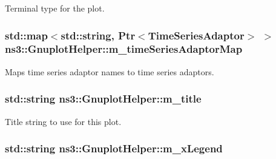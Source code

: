 Terminal type for the plot. 

\subsubsection[{\texorpdfstring{m\+\_\+time\+Series\+Adaptor\+Map}{m_timeSeriesAdaptorMap}}]{\setlength{\rightskip}{0pt plus 5cm}std\+::map$<$std\+::string, {\bf Ptr}$<${\bf Time\+Series\+Adaptor}$>$ $>$ ns3\+::\+Gnuplot\+Helper\+::m\+\_\+time\+Series\+Adaptor\+Map\hspace{0.3cm}{\ttfamily [private]}}\hypertarget{classns3_1_1GnuplotHelper_ad013691ac007d20ac6c04261dda2432a}{}\label{classns3_1_1GnuplotHelper_ad013691ac007d20ac6c04261dda2432a}


Maps time series adaptor names to time series adaptors. 

\subsubsection[{\texorpdfstring{m\+\_\+title}{m_title}}]{\setlength{\rightskip}{0pt plus 5cm}std\+::string ns3\+::\+Gnuplot\+Helper\+::m\+\_\+title\hspace{0.3cm}{\ttfamily [private]}}\hypertarget{classns3_1_1GnuplotHelper_a06621b5b7087d9aeddc342fba35f95ca}{}\label{classns3_1_1GnuplotHelper_a06621b5b7087d9aeddc342fba35f95ca}


Title string to use for this plot. 

\subsubsection[{\texorpdfstring{m\+\_\+x\+Legend}{m_xLegend}}]{\setlength{\rightskip}{0pt plus 5cm}std\+::string ns3\+::\+Gnuplot\+Helper\+::m\+\_\+x\+Legend\hspace{0.3cm}{\ttfamily [private]}}\hypertarget{classns3_1_1GnuplotHelper_ae7887c71f49d99acb98f6d4d74ef9178}{}\label{classns3_1_1GnuplotHelper_ae7887c71f49d99acb98f6d4d74ef9178}


